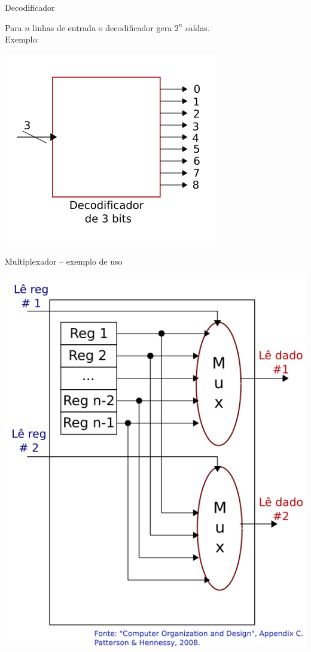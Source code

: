 \begin{frame}[fragile]{Decodificador}

Para $n$ linhas de entrada o \alert{decodificador} gera $2^n$ saídas.\\

Exemplo:

  \begin{center}
    \includegraphics[scale=0.4]{proc-decoder.png}
  \end{center}
\end{frame}

\begin{frame}[fragile]{Multiplexador -- exemplo de uso}
  \begin{center}
    \includegraphics[scale=0.4]{proc-mux_example.png}
  \end{center}
\end{frame}

